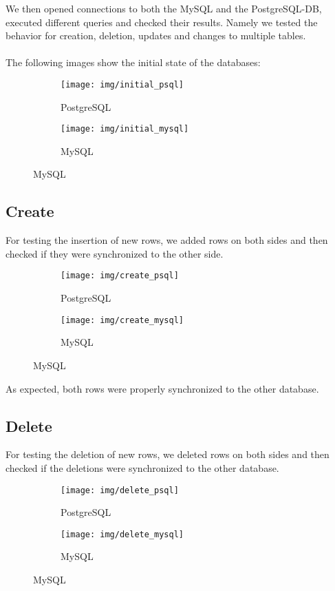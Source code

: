 \documentclass[11pt, a4paper]{article}
\begin{document}
We then opened connections to both the MySQL and the PostgreSQL-DB, executed different queries and checked their results. Namely we tested the behavior for creation, deletion, updates and changes to multiple tables.
\\\\
The following images show the initial state of the databases:

\begin{figure}[H]
	\centering
	\begin{subfigure}[b]{0.35\textwidth}
	\centering
		\texttt{[image: img/initial\_psql]}
		\caption{PostgreSQL}
	\end{subfigure}
	\begin{subfigure}[b]{0.35\textwidth}
		\centering
		\texttt{[image: img/initial\_mysql]}
		\caption{MySQL}
	\end{subfigure}
\end{figure}

\subsection{Create}

For testing the insertion of new rows, we added rows on both sides and then checked if they were synchronized to the other side.

\begin{figure}[H]
	\centering
	\begin{subfigure}[b]{0.45\textwidth}
	\centering
		\texttt{[image: img/create\_psql]}
		\caption{PostgreSQL}
	\end{subfigure}
	\begin{subfigure}[b]{0.45\textwidth}
		\centering
		\texttt{[image: img/create\_mysql]}
		\caption{MySQL}
	\end{subfigure}
\end{figure}
\vspace{-10pt}

As expected, both rows were properly synchronized to the other database.

\subsection{Delete}

For testing the deletion of new rows, we deleted rows on both sides and then checked if the deletions were synchronized to the other database.

\begin{figure}[H]
	\centering
	\begin{subfigure}[b]{0.45\textwidth}
	\centering
		\texttt{[image: img/delete\_psql]}
		\caption{PostgreSQL}
	\end{subfigure}
	\begin{subfigure}[b]{0.45\textwidth}
		\centering
		\texttt{[image: img/delete\_mysql]}
		\caption{MySQL}
	\end{subfigure}
\end{figure}
\vspace{-10pt}
\end{document}
